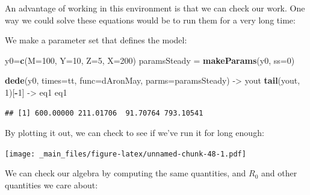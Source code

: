 \documentclass[
]{book}
\newenvironment{Shaded}{\begin{snugshade}}{\end{snugshade}}
\newcommand{\AttributeTok}[1]{\textcolor[rgb]{0.13,0.29,0.53}{#1}}
\newcommand{\DecValTok}[1]{\textcolor[rgb]{0.00,0.00,0.81}{#1}}
\newcommand{\FunctionTok}[1]{\textcolor[rgb]{0.13,0.29,0.53}{\textbf{#1}}}
\newcommand{\NormalTok}[1]{#1}
\newcommand{\OtherTok}[1]{\textcolor[rgb]{0.56,0.35,0.01}{#1}}
\newcommand{\SpecialCharTok}[1]{\textcolor[rgb]{0.81,0.36,0.00}{\textbf{#1}}}
\begin{document}
An advantage of working in this environment is that we can check our work. One way we could solve these equations would be to run them for a very long time:

We make a parameter set that defines the model:

\begin{Shaded}
\begin{Highlighting}[]
\NormalTok{y0}\OtherTok{=}\FunctionTok{c}\NormalTok{(}\AttributeTok{M=}\DecValTok{100}\NormalTok{, }\AttributeTok{Y=}\DecValTok{10}\NormalTok{, }\AttributeTok{Z=}\DecValTok{5}\NormalTok{, }\AttributeTok{X=}\DecValTok{200}\NormalTok{)}
\NormalTok{paramsSteady }\OtherTok{=} \FunctionTok{makeParams}\NormalTok{(y0, }\AttributeTok{ss=}\DecValTok{0}\NormalTok{)}
\end{Highlighting}
\end{Shaded}

\begin{Shaded}
\begin{Highlighting}[]
\FunctionTok{dede}\NormalTok{(y0, }\AttributeTok{times=}\NormalTok{tt, }\AttributeTok{func=}\NormalTok{dAronMay, }\AttributeTok{parms=}\NormalTok{paramsSteady) }\OtherTok{{-}\textgreater{}}\NormalTok{ yout}
\FunctionTok{tail}\NormalTok{(yout, }\DecValTok{1}\NormalTok{)[}\SpecialCharTok{{-}}\DecValTok{1}\NormalTok{] }\OtherTok{{-}\textgreater{}}\NormalTok{ eq1 }
\NormalTok{eq1}
\end{Highlighting}
\end{Shaded}

\begin{verbatim}
## [1] 600.00000 211.01706  91.70764 793.10541
\end{verbatim}

By plotting it out, we can check to see if we've run it for long enough:

\texttt{[image: \_main\_files/figure-latex/unnamed-chunk-48-1.pdf]}

We can check our algebra by computing the same quantities, and \(R_0\) and other quantities we care about:
\end{document}

